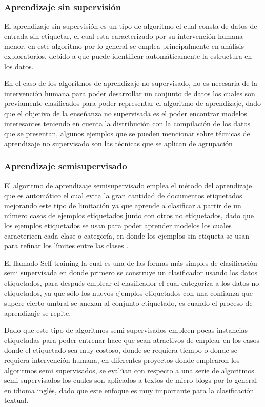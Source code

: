 \subsubsection{Aprendizaje sin supervisión}

El aprendizaje sin supervisión es un tipo de algoritmo el cual consta de datos de entrada sin etiquetar, el cual esta caracterizado por su intervención humana menor, en este algoritmo por lo general se emplea principalmente en análisis exploratorios, debido a que puede identificar automáticamente la estructura en los datos.

En el caso de los algoritmos de aprendizaje no supervisado, no es necesaria de la  intervención humana para poder desarrollar un conjunto de datos  los cuales son previamente clasificados para poder representar el algoritmo de aprendizaje, dado que el objetivo de la enseñanza no supervisada es el poder encontrar modelos interesantes teniendo en cuenta la distribución con la compilación de los datos que se presentan, algunos ejemplos que se pueden mencionar sobre técnicas de aprendizaje no supervisado son las técnicas que se aplican de agrupación \cite{GonzalezPerez2020}.

\subsubsection{Aprendizaje semisupervisado}

El algoritmo de aprendizaje semisupervisado emplea el método del aprendizaje que es automático el cual evita la gran cantidad de documentos etiquetados mejorando este tipo de limitación ya que aprende a clasificar a partir de un número casos de ejemplos etiquetados junto con otros no etiquetados, dado que los ejemplos etiquetados se usan para poder aprender modelos los cuales caractericen cada clase o categoría, en donde los ejemplos sin etiqueta se usan para refinar los límites entre las clases \cite{Cardoso2020Apr}.

El llamado Self-training la cual es una de las formas más simples de clasificación semi supervisada en donde primero se construye un clasificador usando los datos etiquetados, para después emplear el clasificador el cual categoriza a los datos no etiquetados, ya que sólo los nuevos ejemplos etiquetados con una confianza que supere cierto umbral se anexan al conjunto etiquetado, es cuando el proceso de aprendizaje se repite.

Dado que este tipo de algoritmos semi supervisados empleen pocas instancias etiquetadas para poder entrenar hace que sean atractivos de emplear en los casos donde el etiquetado sea muy costoso, donde se requiera tiempo o donde se requiera intervención humana, en diferentes proyectos donde emplearon los algoritmos semi supervisados, se evalúan con respecto a una serie de algoritmos semi supervisados los cuales son aplicados a textos de micro-blogs por lo general en idioma inglés, dado que este enfoque es muy importante para la clasificación textual.

